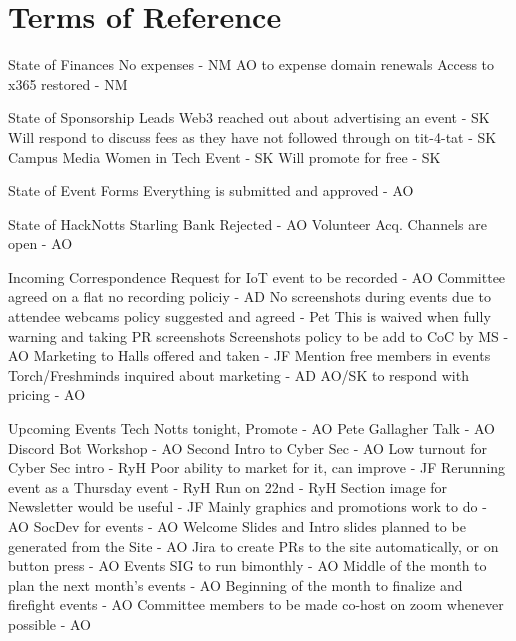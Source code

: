 \documentclass[11pt,hacksoc]{meetingmins}
\begin{document}
\section{Terms of Reference}
\begin{items}
\item {State of Finances}
  \subitem No expenses - NM
  \subitem AO to expense domain renewals
  \subitem Access to x365 restored - NM
\item {State of Sponsorship Leads}
  \subitem Web3 reached out about advertising an event - SK
    \subsubitem Will respond to discuss fees as they have not followed through on tit-4-tat - SK
  \subitem Campus Media Women in Tech Event - SK
    \subsubitem Will promote for free - SK
\item {State of Event Forms}
  \subitem Everything is submitted and approved - AO
\item {State of HackNotts}
  \subitem Starling Bank Rejected - AO
  \subitem Volunteer Acq. Channels are open - AO
\item {Incoming Correspondence}
  \subitem Request for IoT event to be recorded - AO
  \subitem Committee agreed on a flat no recording policiy - AD
  \subitem No screenshots during events due to attendee webcams policy suggested and agreed - Pet
    \subsubitem This is waived when fully warning and taking PR screenshots
    \subsubitem Screenshots policy to be add to CoC by MS - AO
  \subitem Marketing to Halls offered and taken - JF
    \subsubitem Mention free members in events
  \subitem Torch/Freshminds inquired about marketing - AD
    \subsubitem AO/SK to respond with pricing - AO
\item {Upcoming Events}
  \subitem Tech Notts tonight, Promote - AO
  \subitem Pete Gallagher Talk - AO
  \subitem Discord Bot Workshop - AO
  \subitem Second Intro to Cyber Sec - AO
    \subsubitem Low turnout for Cyber Sec intro - RyH
    \subsubitem Poor ability to market for it, can improve - JF
    \subsubitem Rerunning event as a Thursday event - RyH
    \subsubitem Run on 22nd - RyH
    \subsubitem Section image for Newsletter would be useful - JF
  \subitem Mainly graphics and promotions work to do - AO
  \subitem SocDev for events - AO
    \subsubitem Welcome Slides and Intro slides planned to be generated from the Site - AO
    \subsubitem Jira to create PRs to the site automatically, or on button press - AO
  \subitem Events SIG to run bimonthly - AO
    \subsubitem Middle of the month to plan the next month's events - AO
    \subsubitem Beginning of the month to finalize and firefight events - AO
  \subitem Committee members to be made co-host on zoom whenever possible - AO
\end{items}
\end{document}
